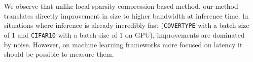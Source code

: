We observe that unlike local sparsity compression based method, our method
translates directly improvement in size to higher bandwidth at inference time.
In situations where inference is already incredibly fast (\texttt{COVERTYPE}
with a batch size of $1$ and \texttt{CIFAR10} with a batch size of $1$ on GPU),
improvements are dominated by noise. However, on machine learning frameworks
more focused on latency it should be possible to measure them.


% 

